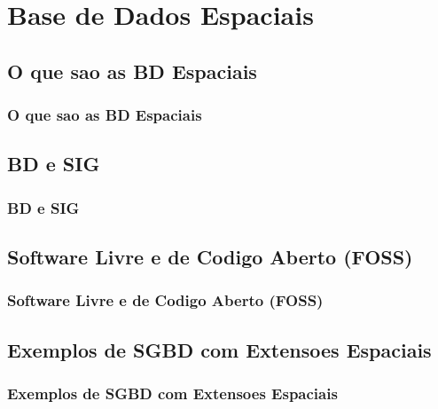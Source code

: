 \documentclass[hyperref={pdfpagelabels=true}]{beamer}
\begin{document}
\section{Base de Dados Espaciais}

\subsection{O que sao as BD Espaciais} 
\begin{frame}
\frametitle{O que sao as BD Espaciais}
\end{frame}


\subsection{BD e SIG} 
\begin{frame}
\frametitle{BD e SIG}
\end{frame}


\subsection{Software Livre e de Codigo Aberto (FOSS)}
\begin{frame}
\frametitle{Software Livre e de Codigo Aberto (FOSS)}
\end{frame}

\subsection{Exemplos de SGBD com Extensoes Espaciais}
\begin{frame}
\frametitle{Exemplos de SGBD com Extensoes Espaciais}
\end{frame}
\end{document}
